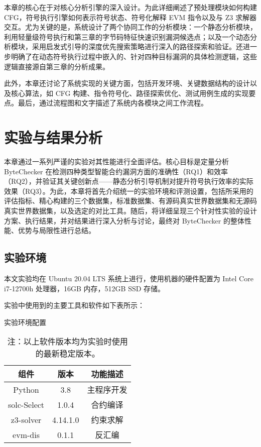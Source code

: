 \documentclass[print, master, vlined, timesmath]{DissertUESTC}
\begin{document}
本章的核心在于对核心分析引擎的深入设计。为此详细阐述了预处理模块如何构建 CFG，符号执行引擎如何表示符号状态、符号化解释 EVM 指令以及与 Z3 求解器交互。尤为关键的是，系统设计了两个协同工作的分析模块：一个静态分析模块，利用轻量级符号执行和第三章的字节码特征快速识别漏洞候选点；以及一个动态分析模块，采用启发式引导的深度优先搜索策略进行深入的路径探索和验证。还进一步明确了在动态符号执行过程中嵌入的、针对四种目标漏洞的具体检测逻辑，这些逻辑直接源自第三章的分析成果。

此外，本章还讨论了系统实现的关键方面，包括开发环境、关键数据结构的设计以及核心算法，如 CFG 构建、指令符号化、路径探索优化、测试用例生成的实现要点。最后，通过流程图和文字描述了系统内各模块之间工作流程。

\chapter{实验与结果分析}


本章通过一系列严谨的实验对其性能进行全面评估。核心目标是定量分析 ByteChecker 在检测四种类型智能合约漏洞方面的准确性（RQ1）和效率（RQ2），并验证其关键创新点——静态分析引导机制对提升符号执行效率的实际效果（RQ3）。为此，本章将首先介绍统一的实验环境和评测设置，包括所采用的评估指标、精心构建的三个数据集，标准数据集、有源码真实世界数据集和无源码真实世界数据集，以及选定的对比工具。随后，将详细呈现三个针对性实验的设计方案、执行结果，并对结果进行深入分析与讨论，最终对 ByteChecker 的整体性能、优势与局限性进行总结。

\section{实验环境}

本文实验均在 Ubuntu 20.04 LTS 系统上进行，使用机器的硬件配置为 Intel Core i7-12700h 处理器，16GB 内存，512GB SSD 存储。

实验中使用到的主要工具和软件如下表所示：

\begin{table}[H]
    \centering
    \caption{实验环境配置}
    \label{tab:env_config}
    \begin{tabular}{|c|c|c|}
        \hline
        \textbf{组件} & \textbf{版本} & \textbf{功能描述}\\ \hline
        Python & 3.8 & 主程序开发\\ \hline
        solc-Select & 1.0.4 & 合约编译\\ \hline
        z3-solver & 4.14.1.0 & 约束求解\\ \hline
        evm-dis & 0.1.1 & 反汇编\\ \hline
    \end{tabular}
    \caption*{注：以上软件版本均为实验时使用的最新稳定版本。}
\end{table}
\end{document}
